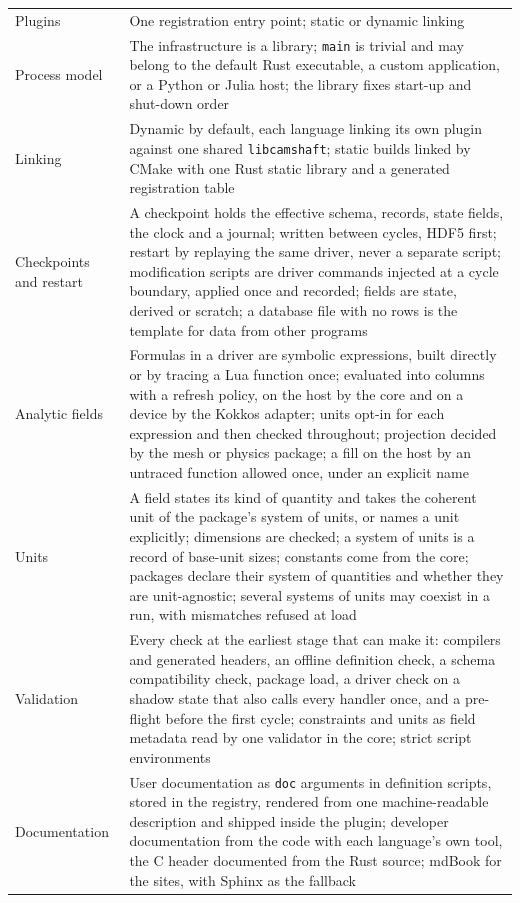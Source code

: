 \documentclass[11pt,a4paper]{article}
\newcommand{\code}[1]{\texttt{#1}}
\begin{document}
{\begin{xltabular}{\textwidth}{@{}>{\raggedright\arraybackslash}p{32mm} L@{}}
Plugins & One registration entry point; static or dynamic linking \\
Process model & The infrastructure is a library; \code{main} is trivial and may belong to the default Rust executable, a custom application, or a Python or Julia host; the library fixes start-up and shut-down order \\
Linking & Dynamic by default, each language linking its own plugin against one shared \code{libcamshaft}; static builds linked by CMake with one Rust static library and a generated registration table \\
Checkpoints and restart & A checkpoint holds the effective schema, records, state fields, the clock and a journal; written between cycles, HDF5 first; restart by replaying the same driver, never a separate script; modification scripts are driver commands injected at a cycle boundary, applied once and recorded; fields are state, derived or scratch; a database file with no rows is the template for data from other programs \\
Analytic fields & Formulas in a driver are symbolic expressions, built directly or by tracing a Lua function once; evaluated into columns with a refresh policy, on the host by the core and on a device by the Kokkos adapter; units opt-in for each expression and then checked throughout; projection decided by the mesh or physics package; a fill on the host by an untraced function allowed once, under an explicit name \\
Units & A field states its kind of quantity and takes the coherent unit of the package's system of units, or names a unit explicitly; dimensions are checked; a system of units is a record of base-unit sizes; constants come from the core; packages declare their system of quantities and whether they are unit-agnostic; several systems of units may coexist in a run, with mismatches refused at load \\
Validation & Every check at the earliest stage that can make it: compilers and generated headers, an offline definition check, a schema compatibility check, package load, a driver check on a shadow state that also calls every handler once, and a pre-flight before the first cycle; constraints and units as field metadata read by one validator in the core; strict script environments \\
Documentation & User documentation as \code{doc} arguments in definition scripts, stored in the registry, rendered from one machine-readable description and shipped inside the plugin; developer documentation from the code with each language's own tool, the C header documented from the Rust source; mdBook for the sites, with Sphinx as the fallback \\

\end{xltabular}}
\end{document}
